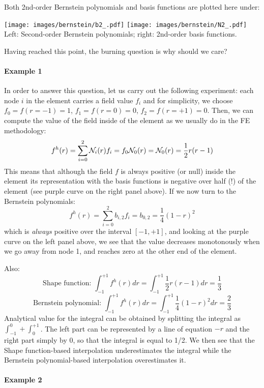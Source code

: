 Both 2nd-order Bernstein polynomials and basis functions are plotted here under:
\begin{center}
\texttt{[image: images/bernstein/b2\_.pdf]}
\texttt{[image: images/bernstein/N2\_.pdf]}\\
{\captionfont Left: Second-order Bernstein polynomials; right: 2nd-order basis functions.}
\end{center}

Having reached this point, the burning question is why should we care?

\paragraph{Example 1}
In order to answer this question, let us carry out the following 
experiment: each node $i$ in the element carries a field value $f_i$ and for simplicity, 
we choose $f_0=f(r=-1)=1$, $f_1=f(r=0)=0$, $f_2=f(r=+1)=0$.
Then, we can compute the value of the field inside of the element 
as we usually do in the FE methodology:
\[
f^h(r) = \sum_{i=0}^2 {\mathcal{N}}_i(r) f_i = f_0 {\mathcal{N}}_0(r) = {\mathcal{N}}_0(r) = \frac{1}{2}r(r-1)
\]
This means that although the field $f$ is always positive (or null) inside the element
its representation with the basis functions is negative over half (!) of the element
(see purple curve on the right panel above).
If we now turn to the Bernstein polynomials:
\[
f^h(r) = \sum_{i=0}^2 b_{i,2} f_i = b_{0,2} = \frac{1}{4}(1-r)^2
\]
which is {\it always} positive over the interval $[-1,+1]$, 
and looking at the purple curve on the left panel above, 
we see that the value decreases monotonously when we go away from node 1, and reaches 
zero at the other end of the element. 

Also:
\[
\text{Shape function: } \int_{-1}^{+1} f^h(r)dr = \int_{-1}^{+1} \frac{1}{2}r(r-1) dr = \frac{1}{3}  
\]
\[
\text{Bernstein polynomial: } \int_{-1}^{+1} f^h(r)dr =  \int_{-1}^{+1} \frac{1}{4}(1-r)^2 dr=  \frac{2}{3}  
\]
Analytical value for the integral can be obtained by splitting the integral as $\int_{-1}^0 + \int_0^{+1}$.
The left part can be represented by a line of equation $-r$ and the right part simply by 0, so that the 
integral is equal to 1/2. We then see that the Shape function-based interpolation underestimates
the integral while the Bernstein polynomial-based interpolation overestimates it.


\paragraph{Example 2}

